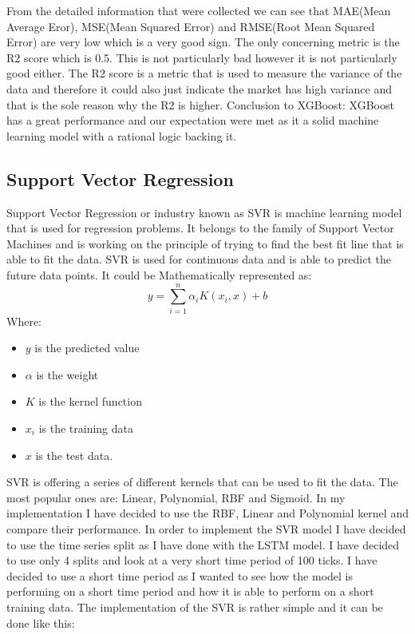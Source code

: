 \documentclass{imc-inf}
\begin{document}
	From the detailed information that were collected we can see that MAE(Mean Average Eror), MSE(Mean Squared Error) and RMSE(Root Mean Squared Error) are very low which is a very good sign. The only concerning metric is the R2 score which is 0.5.
	This is not particularly bad however it is not particularly good either. The R2 score is a metric that is used to measure the variance of the data and therefore it could also just indicate the market has high variance and that is the 
	sole reason why the R2 is higher. Conclusion to XGBoost: XGBoost has a great performance and our expectation were met as it a solid machine learning model with a rational logic backing it.
	\subsection{Support Vector Regression}
	Support Vector Regression or industry known as SVR \cite{svr_implement} is machine learning model that is used for regression problems. It belongs to the family of Support Vector Machines and is working on the 
	principle of trying to find the best fit line that is able to fit the data. SVR is used for continuous data and is able to predict the future data points. It could be Mathematically represented as:
	\begin{equation}
		y = \sum_{i=1}^{n} \alpha_i K(x_i,x) + b
	\end{equation}
	Where:
	\begin{itemize}
		\item $y$ is the predicted value
		\item  $\alpha$ is the weight 
		\item  $K$ is the kernel function
		\item  $x_i$ is the training data
		\item  $x$ is the test data.
		
	\end{itemize}
	SVR is offering a series of different kernels that can be used to fit the data. The most popular ones are: Linear, Polynomial, RBF and Sigmoid.
	In my implementation I have decided to use the RBF, Linear and Polynomial kernel and compare their performance. In order to implement the SVR model I have decided to use the time series split as I have done with the LSTM model.
	I have decided to use only 4 splits and look at a very short time period of 100 ticks. I have decided to use a short time period as I wanted to see how the model is performing on a short time period and how it is able to perform 
	on a short training data. The implementation of the SVR is rather simple and it can be done like this:
\end{document}

